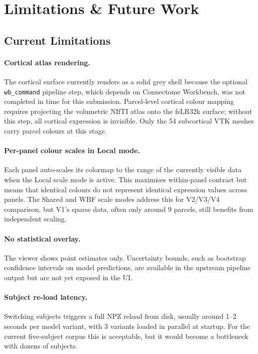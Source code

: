 \documentclass[11pt,letterpaper]{article}
\begin{document}
\section{Limitations \& Future Work}
\label{sec:limits}

\subsection{Current Limitations}

\paragraph{Cortical atlas rendering.}
The cortical surface currently renders as a solid grey shell because
the optional \texttt{wb\_command} pipeline step, which depends on
Connectome Workbench, was not completed in time for this submission.
Parcel-level cortical colour mapping requires projecting the volumetric
NIfTI atlas onto the fsLR32k surface; without this step, all cortical
expression is invisible.
Only the 54 subcortical VTK meshes carry parcel colours at this stage.

\paragraph{Per-panel colour scales in Local mode.}
Each panel auto-scales its colormap to the range of the currently
visible data when the Local scale mode is active.
This maximises within-panel contrast but means that identical colours
do not represent identical expression values across panels.
The Shared and WBF scale modes address this for V2/V3/V4 comparison,
but V1's sparse data, often only around 9 parcels, still benefits from
independent scaling.

\paragraph{No statistical overlay.}
The viewer shows point estimates only.
Uncertainty bounds, such as bootstrap confidence intervals on model
predictions, are available in the upstream pipeline output but are not
yet exposed in the UI.

\paragraph{Subject re-load latency.}
Switching subjects triggers a full NPZ reload from disk, usually around
1--2 seconds per model variant, with 3 variants loaded in parallel at startup.
For the current five-subject corpus this is acceptable, but it would become
a bottleneck with dozens of subjects.
\end{document}
